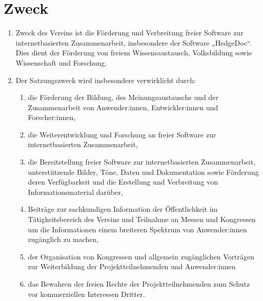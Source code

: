 \documentclass[12pt,paper=a4,ngerman]{scrreprt}
\begin{document}
	\section{Zweck}
	\begin{enumerate}
		\item
			Zweck des Vereins ist die Förderung und Verbreitung freier Software zur internetbasierten Zusammenarbeit, insbesondere der Software „HedgeDoc“. Dies dient der Förderung von freiem Wissensaustausch, Volksbildung sowie Wissenschaft und Forschung.
		\item
			Der Satzungszweck wird insbesondere verwirklicht durch:
		    \begin{enumerate}
    			\item
    			    die Förderung der Bildung, des Meinungsaustauschs und der Zusammenarbeit von Anwender:innen, Entwickler:innen und Forscher:innen,
			    \item
			        die Weiterentwicklung und Forschung an freier Software zur internetbasierten Zusammenarbeit,
		        \item
		            die Bereitstellung freier Software zur internetbasierten Zusammenarbeit, unterstützende Bilder, Töne, Daten und Dokumentation sowie Förderung deren Verfügbarkeit und die Erstellung und Verbreitung von Informationsmaterial darüber,
	            \item
	                Beiträge zur sachkundigen Information der Öffentlichkeit im Tätigkeitsbereich des Vereins und Teilnahme an Messen und Kongressen um die Informationen einem breiteren Spektrum von Anwender:innen zugänglich zu machen,
	            \item
	                der Organisation von Kongressen und allgemein zugänglichen Vorträgen zur Weiterbildung der Projektteilnehmenden und Anwender:innen
	            \item
	                das Bewahren der freien Rechte der Projektteilnehmenden zum Schutz vor kommerziellen Interessen Dritter. 
		    \end{enumerate}
	\end{enumerate}
	
\end{document}
